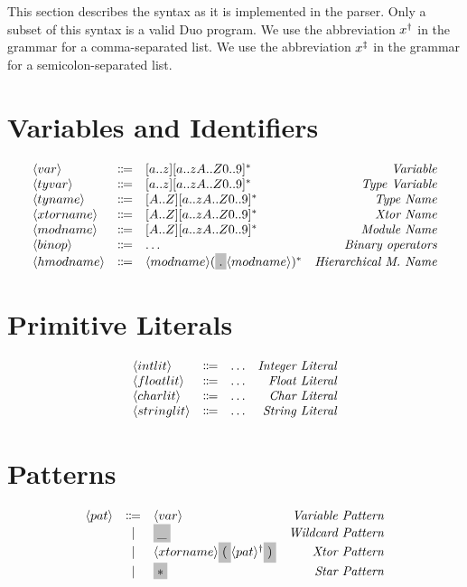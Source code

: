 This section describes the syntax as it is implemented in the parser.
Only a subset of this syntax is a valid Duo program.
We use the abbreviation $x^{\dagger}$ in the grammar for a comma-separated list.
We use the abbreviation $x^{\ddagger}$ in the grammar for a semicolon-separated list.

\section{Variables and Identifiers}

\[
  \begin{array}{lclr}
    \nonterminal{var} & \Coloneqq & [a..z][a..zA..Z0..9]^{\ast} & \emph{Variable} \\
    \nonterminal{tyvar} & \Coloneqq & [a..z][a..zA..Z0..9]^{\ast} & \emph{Type Variable} \\
    \nonterminal{tyname} & \Coloneqq & [A..Z][a..zA..Z0..9]^{\ast} & \emph{Type Name} \\
    \nonterminal{xtorname} & \Coloneqq & [A..Z][a..zA..Z0..9]^{\ast} & \emph{Xtor Name} \\
    \nonterminal{modname} & \Coloneqq &  [A..Z][a..zA..Z0..9]^{\ast} & \emph{Module Name} \\
    \nonterminal{binop} & \Coloneqq & \ldots & \emph{Binary operators} \\
    \nonterminal{hmodname} & \Coloneqq & \nonterminal{modname}(\terminal{.}\nonterminal{modname})^{\ast} & \emph{Hierarchical M. Name}
  \end{array}
\]

\section{Primitive Literals}
\[
  \begin{array}{lclr}
    \langle intlit \rangle & \Coloneqq & \ldots & \emph{Integer Literal} \\
    \langle floatlit \rangle & \Coloneqq & \ldots & \emph{Float Literal} \\
    \langle charlit \rangle & \Coloneqq & \ldots & \emph{Char Literal} \\
    \langle stringlit \rangle & \Coloneqq & \ldots & \emph{String Literal} \\
  \end{array}
\]

\section{Patterns}
\[
  \begin{array}{lclr}
    \nonterminal{pat} & \Coloneqq & \nonterminal{var} & \emph{Variable Pattern} \\
    & | & \terminal{\_} & \emph{Wildcard Pattern} \\
    & | & \nonterminal{xtorname}\terminal{(}\commalist{\nonterminal{pat}} \terminal{)} & \emph{Xtor Pattern}\\
    & | & \terminal{$\ast$} & \emph{Star Pattern} \\
  \end{array}
\]

